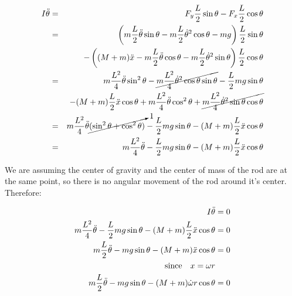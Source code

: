 \documentclass{notes}
\begin{document}
 \begin{eqnarray*}
   I\ddot{\theta} & = & F_y\dfrac{L}{2}\sin\theta - F_x\dfrac{L}{2}\cos\theta \\
     & = & \left( m\dfrac{L}{2}\ddot{\theta}\sin\theta - m\dfrac{L}{2}\dot{\theta}^2\cos\theta 
            - mg\right) \dfrac{L}{2}\sin\theta \\
     &   & -\left( (M+m)\ddot{x} - m\dfrac{L}{2}\ddot{\theta}\cos\theta - 
             m\dfrac{L}{2}\dot{\theta}^2\sin\theta \right) \dfrac{L}{2}\cos\theta\\
     & = & m\dfrac{L^2}{4}\ddot{\theta}\sin^2\theta 
           - \cancel{m\dfrac{L^2}{4}\dot{\theta}^2\cos\theta\sin\theta} - \dfrac{L}{2}mg\sin\theta\\
     &   & - (M+m) \dfrac{L}{2} \ddot{x}\cos\theta + m\dfrac{L^2}{4}\ddot{\theta}\cos^2\theta + 
             \cancel{m\dfrac{L^2}{4}\dot{\theta}^2\sin\theta\cos\theta} \\
     & = & m\dfrac{L^2}{4}\ddot{\theta}\cancelto{1}{(\sin^2\theta + \cos^2\theta)}
           - \dfrac{L}{2}mg\sin\theta - (M+m) \dfrac{L}{2}\ddot{x}\cos\theta \\
     & = & m \dfrac{L^2}{4}\ddot{\theta} - \dfrac{L}{2}mg\sin\theta 
           - (M+m) \dfrac{L}{2} \ddot{x}\cos\theta
 \end{eqnarray*}

We are assuming the center of gravity and the center of mass of the rod are at the same point, so
there is no angular movement of the rod around it's center. Therefore:

\begin{align}
  I\ddot{\theta} & = 0 \nonumber\\
  m \dfrac{L^2}{4}\ddot{\theta} - \dfrac{L}{2}mg\sin\theta 
      - (M+m) \dfrac{L}{2} \ddot{x}\cos\theta  & = 0 \nonumber\\
  m\dfrac{L}{2}\ddot{\theta} - mg\sin\theta - (M+m)\ddot{x}\cos\theta & = 0 \nonumber\\
  \mbox{\hspace{10pt}since\hspace{10pt}} x = \omega r & \nonumber\\
  m\dfrac{L}{2}\ddot{\theta} - mg\sin\theta - (M+m)\dot{\omega}r\cos\theta & = 0 \nonumber
\end{align}
\end{document}
